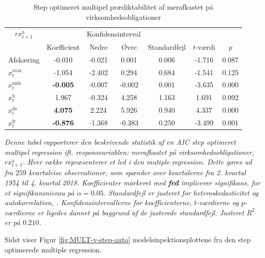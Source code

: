 \documentclass[
  a4paper,
  oneside]{memoir}
\begin{document}
\begin{table}[H]

\caption{\label{tab:MULT-step-v}Step optimeret multipel prædiktabilitet af merafkastet på virksomhedsobligationer}
\centering
\begin{threeparttable}
\begin{tabular}[t]{lcccccc}
\toprule
\multicolumn{1}{c}{$rx_{t+1}^{\text{a}}$} & \multicolumn{1}{c}{ } & \multicolumn{2}{c}{Konfidensinterval} & \multicolumn{3}{c}{ } \\
\cmidrule(l{3pt}r{3pt}){1-1} \cmidrule(l{3pt}r{3pt}){3-4}
  & Koefficient & Nedre & Øvre & Standardfejl & $t$-værdi & $p$\\
\midrule
\rowcolor{gray!6}  Afskæring & -0.010 & -0.021 & 0.001 & 0.006 & -1.716 & 0.087\\
$x_t^{\text{avar}}$ & -1.054 & -2.402 & 0.294 & 0.684 & -1.541 & 0.125\\
\rowcolor{gray!6}  $x_t^{\text{smb}}$ & \textbf{-0.005} & -0.007 & -0.002 & 0.001 & -3.635 & 0.000\\
$x_t^{\text{b}}$ & 1.967 & -0.324 & 4.258 & 1.163 & 1.691 & 0.092\\
\rowcolor{gray!6}  $x_t^{\text{ds}}$ & \textbf{ 4.075} & 2.224 & 5.926 & 0.940 & 4.337 & 0.000\\
$x_t^{\text{fr}}$ & \textbf{-0.876} & -1.368 & -0.383 & 0.250 & -3.499 & 0.001\\
\bottomrule
\end{tabular}
\begin{tablenotes}
\item \textit{Denne tabel rapporterer den beskrivende statistik af en AIC step optimeret multipel regression ift. responsvariablen: merafkastet på virksomhedsobligationer, $rx_{t+1}^{\text{a}}$. Hver række repræsenterer et led i den mutiple regression. Dette gøres ud fra $259$ kvartalvise observationer, som spænder over kvartalerne fra 2. kvartal 1954 til 4. kvartal 2018. Koefficienter markeret med \textbf{fed} implicerer signifikans, for et signifikansniveau på $\alpha=0.05$. Standardfejl er justeret for heteroskedasticitet og autokorrelation, \citep{Newey1987}. Konfidensintervallerne for koefficienterne, $t$-værdierne og $p$-værdierne er ligedes dannet på baggrund af de justerede standardfejl. Justeret $R^2$ er på $0.210$.}
\end{tablenotes}
\end{threeparttable}
\end{table}

Sidst viser Figur \ref{fig:MULT-v-step-auto} modelsinpektionsplottene fra den step optimerede multiple regression.
\end{document}
